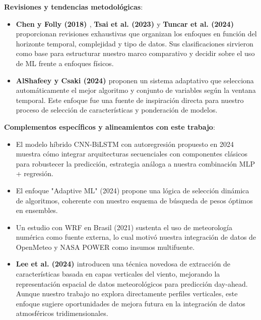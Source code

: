 \documentclass[conference]{IEEEtran}
\begin{document}
	\vspace{0.3cm}
	
	\textbf{Revisiones y tendencias metodológicas}:
	\begin{itemize}[leftmargin=*,itemsep=1pt]
		\item \textbf{Chen y Folly (2018) \cite{chen2018wind}}, \textbf{Tsai et al. (2023) \cite{tsai2023review}} y \textbf{Tuncar et al. (2024) \cite{tuncar2024review}} proporcionan revisiones exhaustivas que organizan los enfoques en función del horizonte temporal, complejidad y tipo de datos. Sus clasificaciones sirvieron como base para estructurar nuestro marco comparativo y decidir sobre el uso de ML frente a enfoques físicos.
		\item \textbf{AlShafeey y Csaki (2024) \cite{alshafeey2024adaptive}} proponen un sistema adaptativo que selecciona automáticamente el mejor algoritmo y conjunto de variables según la ventana temporal. Este enfoque fue una fuente de inspiración directa para nuestro proceso de selección de características y ponderación de modelos.
	\end{itemize}
	
	\vspace{0.3cm}
	
	\textbf{Complementos específicos y alineamientos con este trabajo}:
	\begin{itemize}[leftmargin=*,itemsep=1pt]
		\item El modelo híbrido CNN-BiLSTM con autoregresión propuesto en 2024 \cite{zhang2024cnnbilstm} muestra cómo integrar arquitecturas secuenciales con componentes clásicos para robustecer la predicción, estrategia análoga a nuestra combinación MLP + regresión.
		\item El enfoque "Adaptive ML" (2024) \cite{alshafeey2024adaptive} propone una lógica de selección dinámica de algoritmos, coherente con nuestro esquema de búsqueda de pesos óptimos en ensembles.
		\item Un estudio con WRF en Brasil (2021) \cite{jacondino2021hourly} sustenta el uso de meteorología numérica como fuente externa, lo cual motivó nuestra integración de datos de OpenMeteo y NASA POWER como insumos multifuente.
		\item \textbf{Lee et al. (2024) \cite{lee2024vertical}} introducen una técnica novedosa de extracción de características basada en capas verticales del viento, mejorando la representación espacial de datos meteorológicos para predicción day-ahead. Aunque nuestro trabajo no explora directamente perfiles verticales, este enfoque sugiere oportunidades de mejora futura en la integración de datos atmosféricos tridimensionales.
		
	\end{itemize}
	
\end{document}
